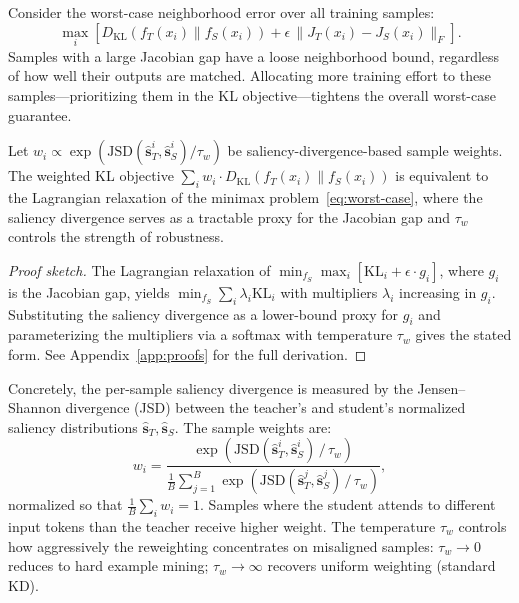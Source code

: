 Consider the worst-case neighborhood error over all training samples:
\begin{equation}\label{eq:worst-case}
\max_{i} \left[ D_\mathrm{KL}(f_T(x_i) \| f_S(x_i)) + \epsilon \, \|J_T(x_i) - J_S(x_i)\|_F \right].
\end{equation}
Samples with a large Jacobian gap have a loose neighborhood bound, regardless of how well their outputs are matched. Allocating more training effort to these samples---prioritizing them in the KL objective---tightens the overall worst-case guarantee.

\begin{theorem}\label{thm:dro}
Let $w_i \propto \exp(\mathrm{JSD}(\hat{\mathbf{s}}_T^i, \hat{\mathbf{s}}_S^i) / \tau_w)$ be saliency-divergence-based sample weights. The weighted KL objective $\sum_i w_i \cdot D_\mathrm{KL}(f_T(x_i) \| f_S(x_i))$ is equivalent to the Lagrangian relaxation of the minimax problem~\eqref{eq:worst-case}, where the saliency divergence serves as a tractable proxy for the Jacobian gap and $\tau_w$ controls the strength of robustness.
\end{theorem}

\begin{proof}[Proof sketch]
The Lagrangian relaxation of $\min_{f_S} \max_i [\mathrm{KL}_i + \epsilon \cdot g_i]$, where $g_i$ is the Jacobian gap, yields $\min_{f_S} \sum_i \lambda_i \mathrm{KL}_i$ with multipliers $\lambda_i$ increasing in $g_i$. Substituting the saliency divergence as a lower-bound proxy for $g_i$ and parameterizing the multipliers via a softmax with temperature $\tau_w$ gives the stated form. See Appendix~\ref{app:proofs} for the full derivation.
\end{proof}

Concretely, the per-sample saliency divergence is measured by the Jensen--Shannon divergence (JSD) between the teacher's and student's normalized saliency distributions $\hat{\mathbf{s}}_T, \hat{\mathbf{s}}_S$. The sample weights are:
\begin{equation}\label{eq:weights}
w_i = \frac{\exp\!\left(\mathrm{JSD}(\hat{\mathbf{s}}_T^i, \hat{\mathbf{s}}_S^i) \,/\, \tau_w\right)}{\frac{1}{B}\sum_{j=1}^B \exp\!\left(\mathrm{JSD}(\hat{\mathbf{s}}_T^j, \hat{\mathbf{s}}_S^j) \,/\, \tau_w\right)},
\end{equation}
normalized so that $\frac{1}{B}\sum_i w_i = 1$. Samples where the student attends to different input tokens than the teacher receive higher weight. The temperature $\tau_w$ controls how aggressively the reweighting concentrates on misaligned samples: $\tau_w \to 0$ reduces to hard example mining; $\tau_w \to \infty$ recovers uniform weighting (standard KD).


